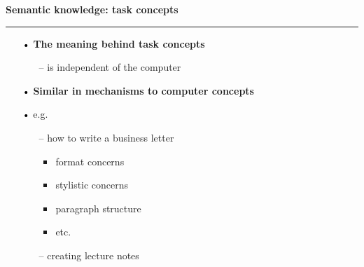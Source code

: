 \documentclass[pdf]{beamer}
\begin{document}
\begin{frame}
\vspace{8mm}
\textcolor{myBlue}{\textbf{\Large{Semantic knowledge: task concepts}}}

\textcolor{red}{\rule{10cm}{1mm}}

\begin{small}

\begin{itemize}
\item[\textcolor{black}{•}] \textbf{The meaning behind task concepts}
     \begin{itemize}
     \item[\textcolor{black}{--}] is independent of the computer
     \newline
     \end{itemize}

\item[\textcolor{black}{•}] \textbf{Similar in mechanisms to computer concepts}
             
\item[\textcolor{black}{•}] e.g.      
\begin{itemize}
   \item[\textcolor{black}{--}] how to write a business letter
   	\begin{itemize}
		\item format concerns
   		\item stylistic concerns
   		\item paragraph structure
   		\item etc. 
	\end{itemize}
   \item[\textcolor{black}{--}] creating lecture notes
\end{itemize}
\end{itemize}
\end{small}
\end{frame}
\end{document}
